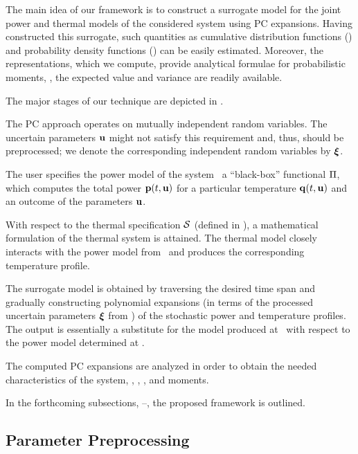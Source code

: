 The main idea of our framework is to construct a surrogate model for the joint
power and thermal models of the considered system using PC expansions. Having
constructed this surrogate, such quantities as cumulative distribution functions
(\cdfs) and probability density functions (\pdfs) can be easily estimated.
Moreover, the representations, which we compute, provide analytical formulae for
probabilistic moments, \ie, the expected value and variance are readily
available.

The major stages of our technique are depicted in .

The PC approach operates on mutually independent random variables. The uncertain
parameters $\mathbf{u}$ might not satisfy this requirement and, thus, should be
preprocessed; we denote the corresponding independent random variables by $\boldsymbol{\xi}$.

The user specifies the power model of the system \via\ a ``black-box''
functional $\oPower$, which computes the total power $\mathbf{p}(t, \mathbf{u})$ for a
particular temperature $\mathbf{q}(t, \mathbf{u})$ and an outcome of the parameters $\mathbf{u}$.

With respect to the thermal specification $\mathcal{S}$ (defined in
), a mathematical formulation of the thermal system is
attained. The thermal model closely interacts with the power model from
\ and produces the corresponding temperature profile.

The surrogate model is obtained by traversing the desired time span and
gradually constructing polynomial expansions (in terms of the processed
uncertain parameters $\boldsymbol{\xi}$ from ) of the stochastic power and
temperature profiles. The output is essentially a substitute for the model
produced at \ with respect to the power model determined at .

The computed PC expansions are analyzed in order to obtain the needed
characteristics of the system, \eg, \cdfs, \pdfs, and moments.

In the forthcoming subsections,
--, the proposed framework is
outlined.

\subsection{Parameter Preprocessing} 


